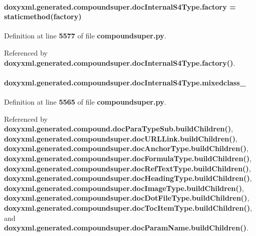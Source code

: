 \paragraph[{factory}]{\setlength{\rightskip}{0pt plus 5cm}doxyxml.\+generated.\+compoundsuper.\+doc\+Internal\+S4\+Type.\+factory = staticmethod(factory)\hspace{0.3cm}{\ttfamily [static]}}\label{classdoxyxml_1_1generated_1_1compoundsuper_1_1docInternalS4Type_aecd7c5a75a5471ee7126e5c0dc4ff4cd}


Definition at line {\bf 5577} of file {\bf compoundsuper.\+py}.



Referenced by {\bf doxyxml.\+generated.\+compoundsuper.\+doc\+Internal\+S4\+Type.\+factory()}.

\paragraph[{mixedclass\+\_\+}]{\setlength{\rightskip}{0pt plus 5cm}doxyxml.\+generated.\+compoundsuper.\+doc\+Internal\+S4\+Type.\+mixedclass\+\_\+}\label{classdoxyxml_1_1generated_1_1compoundsuper_1_1docInternalS4Type_a3de6c3a042cbfb88f0a5fc5990cc10cc}


Definition at line {\bf 5565} of file {\bf compoundsuper.\+py}.



Referenced by {\bf doxyxml.\+generated.\+compound.\+doc\+Para\+Type\+Sub.\+build\+Children()}, {\bf doxyxml.\+generated.\+compoundsuper.\+doc\+U\+R\+L\+Link.\+build\+Children()}, {\bf doxyxml.\+generated.\+compoundsuper.\+doc\+Anchor\+Type.\+build\+Children()}, {\bf doxyxml.\+generated.\+compoundsuper.\+doc\+Formula\+Type.\+build\+Children()}, {\bf doxyxml.\+generated.\+compoundsuper.\+doc\+Ref\+Text\+Type.\+build\+Children()}, {\bf doxyxml.\+generated.\+compoundsuper.\+doc\+Heading\+Type.\+build\+Children()}, {\bf doxyxml.\+generated.\+compoundsuper.\+doc\+Image\+Type.\+build\+Children()}, {\bf doxyxml.\+generated.\+compoundsuper.\+doc\+Dot\+File\+Type.\+build\+Children()}, {\bf doxyxml.\+generated.\+compoundsuper.\+doc\+Toc\+Item\+Type.\+build\+Children()}, and {\bf doxyxml.\+generated.\+compoundsuper.\+doc\+Param\+Name.\+build\+Children()}.

